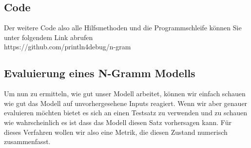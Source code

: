\documentclass[12pt]{article}
\begin{document}
\subsection{Code}
Der weitere Code also alle Hilfsmethoden und die Programmschleife können Sie unter folgendem Link abrufen\\
https://github.com/println4debug/n-gram
\subsection{Evaluierung eines N-Gramm Modells}
\quad Um nun zu ermitteln, wie gut unser Modell arbeitet, können wir einfach schauen wie gut das Modell auf unvorhergesehene Inputs reagiert. Wenn wir aber genauer evaluieren möchten bietet es sich an einen Testsatz zu verwenden und zu schauen wie wahrscheinlich es ist dass das Modell diesen Satz vorhersagen kann. Für dieses Verfahren wollen wir also eine Metrik, die diesen Zustand numerisch zusammenfasst.
\end{document}
